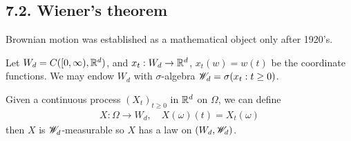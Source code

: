 \documentclass[10pt,a4paper]{report}
\begin{document}
\subsection*{7.2. Wiener's theorem}

Brownian motion was established as a mathematical object only after 1920's.
\s

Let $W_d = C([0,\infty), \mathbb{R}^d)$, and $x_t : W_d \rightarrow \mathbb{R}^d$, $x_t(w) = w(t)$ be the coordinate functions. We may endow $W_d$ with $\sigma$-algebra $\mathscr{W}_d = \sigma(x_t:t\geq 0)$. 
\s

Given a continuous process $(X_t)_{t\geq 0}$ in $\mathbb{R}^d$ on $\Omega$, we can define 
\begin{align*}
X : \Omega \rightarrow W_d, \quad X(\omega)(t) = X_t(\omega)
\end{align*}
then $X$ is $\mathscr{W}_d$-measurable so $X$ has a law on $(W_d, \mathscr{W}_d)$.
\s
\end{document}
